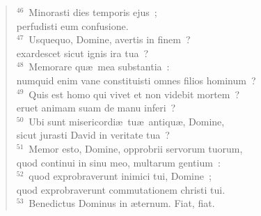 \begin{flushleft}
\begin{verse}
${}^{46}$~Minorasti dies temporis ejus~;\\ perfudisti eum confusione.\\
${}^{47}$~Usquequo, Domine, avertis in finem~?\\ exardescet sicut ignis ira tua~?\\
${}^{48}$~Memorare qu\ae\ mea substantia~:\\ numquid enim vane constituisti omnes filios hominum~?\\
${}^{49}$~Quis est homo qui vivet et non videbit mortem~?\\ eruet animam suam de manu inferi~?\\
${}^{50}$~Ubi sunt misericordi\ae\ tu\ae\ antiqu\ae , Domine,\\ sicut jurasti David in veritate tua~?\\
${}^{51}$~Memor esto, Domine, opprobrii servorum tuorum,\\ quod continui in sinu meo, multarum gentium~:\\
${}^{52}$~quod exprobraverunt inimici tui, Domine~;\\ quod exprobraverunt commutationem christi tui.\\
${}^{53}$~Benedictus Dominus in \ae ternum. Fiat, fiat.\end{verse}\end{flushleft}


